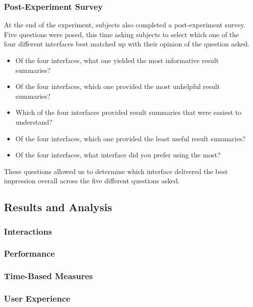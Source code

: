 \subsubsection{Post-Experiment Survey}
At the end of the experiment, subjects also completed a post-experiment survey. Five questions were posed, this time asking subjects to select which one of the four different interfaces best matched up with their opinion of the question asked.

\begin{itemize}
    \item{ Of the four interfaces, what one yielded the most informative result summaries?}
    \item{ Of the four interfaces, which one provided the most unhelpful result summaries?}
    \item{ Which of the four interfaces provided result summaries that were easiest to understand?}
    \item{ Of the four interfaces, which one provided the least useful result summaries?}
    \item{ Of the four interfaces, what interface did you prefer using the most?}
\end{itemize}

These questions allowed us to determine which interface delivered the best impression overall across the five different questions asked.


\subsection{Results and Analysis}

\subsubsection{Interactions}

\subsubsection{Performance}

\subsubsection{Time-Based Measures}

\subsubsection{User Experience}

